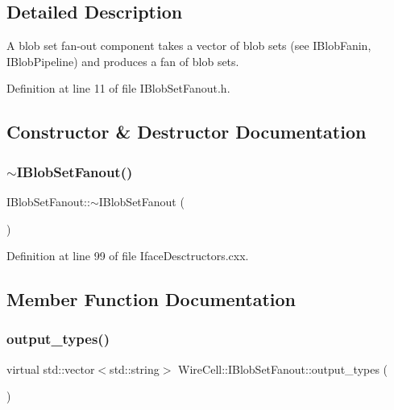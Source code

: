 \subsection{Detailed Description}
A blob set fan-\/out component takes a vector of blob sets (see I\+Blob\+Fanin, I\+Blob\+Pipeline) and produces a fan of blob sets. 

Definition at line 11 of file I\+Blob\+Set\+Fanout.\+h.



\subsection{Constructor \& Destructor Documentation}
\mbox{\label{class_wire_cell_1_1_i_blob_set_fanout_a8bb9aaa91ec385489ff42f8d8d1e3f35}} 
\subsubsection{\texorpdfstring{$\sim$\+I\+Blob\+Set\+Fanout()}{~IBlobSetFanout()}}
{\footnotesize\ttfamily I\+Blob\+Set\+Fanout\+::$\sim$\+I\+Blob\+Set\+Fanout (\begin{DoxyParamCaption}{ }\end{DoxyParamCaption})\hspace{0.3cm}{\ttfamily [virtual]}}



Definition at line 99 of file Iface\+Desctructors.\+cxx.



\subsection{Member Function Documentation}
\mbox{\label{class_wire_cell_1_1_i_blob_set_fanout_ad70f90237cc742ff5bdac87c661ed644}} 
\subsubsection{\texorpdfstring{output\+\_\+types()}{output\_types()}}
{\footnotesize\ttfamily virtual std\+::vector$<$std\+::string$>$ Wire\+Cell\+::\+I\+Blob\+Set\+Fanout\+::output\+\_\+types (\begin{DoxyParamCaption}{ }\end{DoxyParamCaption})\hspace{0.3cm}{\ttfamily [pure virtual]}}



